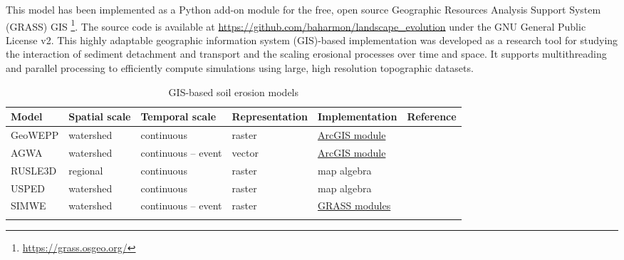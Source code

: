 \documentclass[final,3p,times,twocolumn]{elsarticle}
\begin{document}
This model has been implemented 
as a Python add-on module 
for the free, open source
Geographic Resources Analysis Support System (GRASS) GIS
\footnote{\url{https://grass.osgeo.org/}}. 
The source code is available at 
\url{https://github.com/baharmon/landscape\_evolution} 
under the GNU General Public License v2. %
%
This highly adaptable
geographic information system (GIS)-based implementation
was developed as a research tool for studying 
the interaction of sediment detachment and transport
and the scaling erosional processes over time and space. %
It supports multithreading and parallel processing
to efficiently compute simulations 
using large, high resolution topographic datasets.





\begin{table}
\small
\caption{GIS-based soil erosion models}
\begin{tabu} to \textwidth {XXXXXl}
\toprule
Model & Spatial scale &  Temporal scale & Representation & Implementation & Reference\\
\midrule
GeoWEPP & watershed & continuous & raster & \href{http://geowepp.geog.buffalo.edu/}{ArcGIS module} & \cite{Flanagan2013}\\
AGWA  & watershed & continuous -- event & vector & \href{https://www.tucson.ars.ag.gov/agwa/}{ArcGIS module} & \cite{Guertin2015}\\
RUSLE3D & regional & continuous & raster & map algebra & \cite{Mitasova1996}\\
USPED & watershed & continuous & raster & map algebra & \cite{Mitasova1996}\\
SIMWE & watershed & continuous -- event & raster & \href{https://grass.osgeo.org/grass74/manuals/r.sim.sediment.html}{GRASS modules} & \cite{Mitas1998}\\
\bottomrule
\\
\end{tabu}
\label{table:erosion_models} 
\end{table}
\end{document}
